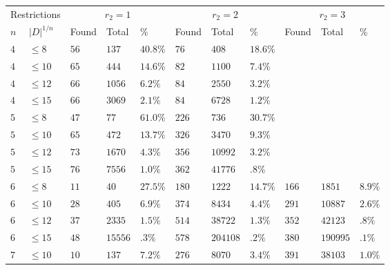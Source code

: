 \documentclass[10pt]{amsart}
\numberwithin{equation}{theorem}
\theoremstyle{definition}
\begin{document}
\begin{figure}[h]
  \centering
  {\small
  \begin{tabular}{|ll|lll|lll|lll|} \hline
    \multicolumn{2}{|l|}{Restrictions} & \multicolumn{3}{c|}{$r_2 = 1$} & \multicolumn{3}{c|}{$r_2 = 2$} & \multicolumn{3}{c|}{$r_2 = 3$} \\
    $n$ & $|D|^{1/n}$ & {\small Found} & {\small Total} & \% & {\small Found} & {\small Total} & \% & {\small Found} & {\small Total} & \% \\ \hline
    $4$ & $\le 8$ & $56$ & $137$ & $40.8\%$ & $76$ & $408$ & $18.6\%$ & & & \\
    $4$ & $\le 10$ & $65$ & $444$ & $14.6\%$ & $82$ & $1100$ & $7.4\%$ & & & \\
    $4$ & $\le 12$ & $66$ & $1056$ & $6.2\%$ & $84$ & $2550$ & $3.2\%$ & & & \\
    $4$ & $\le 15$ & $66$ & $3069$ & $2.1\%$ & $84$ & $6728$ & $1.2\%$ & & & \\
    $5$ & $\le 8$ & $47$ & $77$ & $61.0\%$ & $226$ & $736$ & $30.7\%$ & & & \\
    $5$ & $\le 10$ & $65$ & $472$ & $13.7\%$ & $326$ & $3470$ & $9.3\%$ & & & \\
    $5$ & $\le 12$ & $73$ & $1670$ & $4.3\%$ & $356$ & $10992$ & $3.2\%$ & & & \\
    $5$ & $\le 15$ & $76$ & $7556$ & $1.0\%$ & $362$ & $41776$ & $.8\%$ & & & \\
    $6$ & $\le 8$ & $11$ & $40$ & $27.5\%$ & $180$ & $1222$ & $14.7\%$ & $166$ & $1851$ & $8.9\%$ \\
    $6$ & $\le 10$ & $28$ & $405$ & $6.9\%$ & $374$ & $8434$ & $4.4\%$ & $291$ & $10887$ & $2.6\%$ \\
    $6$ & $\le 12$ & $37$ & $2335$ & $1.5\%$ & $514$ & $38722$ & $1.3\%$ & $352$ & $42123$ & $.8\%$ \\
    $6$ & $\le 15$ & $48$ & $15556$ & $.3\%$ & $578$ & $204108$ & $.2\%$ & $380$ & $190995$ & $.1\%$ \\
    $7$ & $\le 10$ & $10$ & $137$ & $7.2\%$ & $276$ & $8070$ & $3.4\%$ & $391$ & $38103$ & $1.0\%$ \\

\end{tabular}}
\end{figure}
\end{document}
